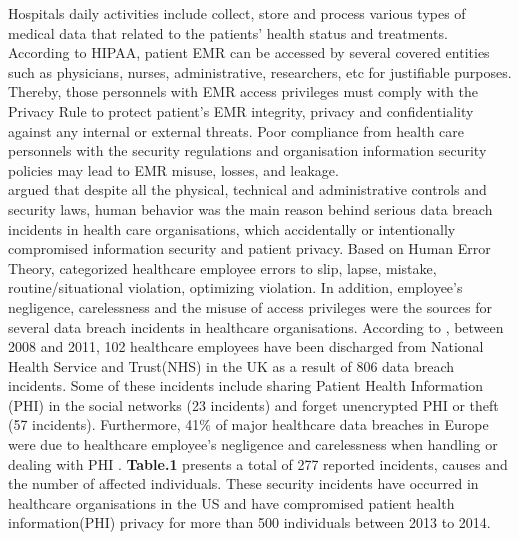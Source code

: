 Hospitals daily activities include collect, store and process various types of medical data that related to the patients' health status and treatments. According to HIPAA, patient EMR can be accessed by several covered entities such as physicians, nurses, administrative, researchers, etc for justifiable purposes. Thereby, those personnels with EMR access privileges must comply with the Privacy Rule to protect patient's EMR integrity, privacy and confidentiality against any internal or external threats. Poor compliance from health care personnels with the security regulations and organisation information security policies may lead to EMR misuse, losses, and leakage.\\
\citet{Kamoun} argued that despite all the physical, technical and administrative controls and security laws, human behavior was the main reason behind serious data breach incidents in health care organisations, which accidentally or intentionally compromised information security and patient privacy. Based on Human Error Theory, \citet{Kamoun} categorized healthcare employee errors to slip, lapse, mistake, routine/situational violation, optimizing violation. In addition, employee’s negligence, carelessness and the misuse of access privileges were the sources for several data breach incidents in healthcare organisations. According to  \cite{Kamoun}, between 2008 and 2011, 102 healthcare employees have been discharged from National Health Service and Trust(NHS) in the UK as a result of 806 data breach incidents. Some of these incidents include sharing Patient Health Information (PHI) in the social networks (23 incidents) and forget unencrypted PHI or theft (57 incidents). Furthermore, 41\% of major healthcare data breaches in Europe were due to healthcare employee’s negligence and carelessness when handling or dealing with PHI \cite{Kierkegaard2012,Kamoun}. \textbf{Table.1} presents a total of 277 reported incidents, causes and the number of affected individuals. These security incidents have occurred in healthcare organisations in the US and have compromised patient health information(PHI) privacy for more than 500 individuals between 2013 to 2014. 

